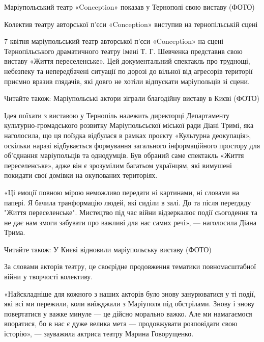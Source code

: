 
 
 
 
 

Маріупольський театр «Conception» показав у Тернополі свою виставу (ФОТО)

Колектив театру авторської п'єси «Conception» виступив на тернопільській сцені

7 квітня маріупольський театр авторської п'єси «Conception» на сцені
Тернопільського драматичного театру імені Т. Г. Шевченка представив свою
виставу «Життя переселенське». Цей документальний спектакль про труднощі,
небезпеку та непередбачені ситуації по дорозі до вільної від агресорів
території приємно вразив глядачів, які довго не хотіли відпускати маріупольців
зі сцени.

Читайте також: Маріупольські актори зіграли благодійну виставу в Києві (ФОТО)

Ідея поїхати з виставою у Тернопіль належить директорці Департаменту
культурно-громадського розвитку Маріупольсьскої міської ради Діані Тримі, яка
наголосила, що ця поїздка відбулася в рамках проєкту «Культурна деокупація»,
оскільки наразі відбувається формування загального інформаційного простору для
об'єднання маріупольців та однодумців. Був обраний саме спектакль «Життя
переселенське», адже він є зрозумілим багатьом українцям, які вимушені покидати
свої домівки на окупованих територіях.

«Ці емоції повною мірою неможливо передати ні картинами, ні словами на папері.
Я бачила транформацію людей, які сиділи в залі. До та після перегдяду "Життя
переселенське". Мистецтво під час війни відзеркалює події сьогодення та не дає
нам змоги забувати про важливі для нас самих речі», — наголосила Діана Трима.

Читайте також: У Києві відновили маріупольську виставу (ФОТО)

За словами акторів театру, це своєрідне продовження тематики повномасштабної
війни у творчості колективу.

«Найскладніше для кожного з наших акторів було знову занурюватися у ті події,
які всі ми пережили, коли виїжджали з Маріуполя під обстрілами. Знову і знову
повертатися у важке минуле — це дійсно морально важко. Але ми намагаємося
впоратися, бо в нас є дуже велика мета — продовжувати розповідати свою
історію», — зауважила актриса театру Марина Говорущенко.


